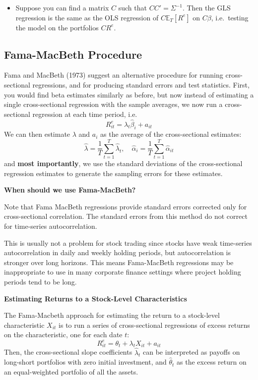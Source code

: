 \documentclass[
]{book}
\providecommand{\tightlist}{%
  \setlength{\itemsep}{0pt}\setlength{\parskip}{0pt}}
\begin{document}
\begin{itemize}
\tightlist
\item
  Suppose you can find a matrix \(C\) such that \(CC'=\Sigma^{-1}\). Then the GLS regression is the same as the OLS regression of \(C\mathbb{E}_T[R^e]\) on \(C\beta\), i.e.~testing the model on the portfolios \(CR^e\).
\end{itemize}

\hypertarget{fama-macbeth-procedure}{%
\subsection{Fama-MacBeth Procedure}\label{fama-macbeth-procedure}}

Fama and MacBeth (1973) suggest an alternative procedure for running cross-sectional regressions, and for producing standard errors and test statistics. First, you would find beta estimates similarly as before, but now instead of estimating a single cross-sectional regression with the sample averages, we now run a cross-sectional regression at each time period, i.e.
\[
R_{it}^{e}=\lambda_{t}\hat{\beta}_{i}+a_{it}
\]
We can then estimate \(\lambda\) and \(a_i\) as the average of the cross-sectional estimates:
\[
\hat{\lambda}=\frac{1}{T}\sum_{t=1}^{T}\hat{\lambda}_{t},\quad\hat{\alpha}_{i}=\frac{1}{T}\sum_{t=1}^{T}\hat{\alpha}_{it}
\]
and \textbf{most importantly}, we use the standard deviations of the cross-sectional regression estimates to generate the sampling errors for these estimates.

\textbf{When should we use Fama-MacBeth?}

Note that Fama MacBeth regressions provide standard errors corrected only for cross-sectional correlation. The standard errors from this method do not correct for time-series autocorrelation.

This is usually not a problem for stock trading since stocks have weak time-series autocorrelation in daily and weekly holding periods, but autocorrelation is stronger over long horizons. This means Fama-MacBeth regressions may be inappropriate to use in many corporate finance settings where project holding periods tend to be long.

\textbf{Estimating Returns to a Stock-Level Characteristics}

The Fama-Macbeth approach for estimating the return to a stock-level characteristic \(X_{it}\) is to run a series of cross-sectional regressions of excess returns on the characteristic, one for each date \(t\):
\[
R_{it}^{e}=\theta_{t}+\lambda_{t}X_{it}+a_{it}
\]
Then, the cross-sectional slope coefficients \(\hat{\lambda}_{t}\) can be interpreted as payoffs on long-short portfolios with zero initial investment, and \(\hat{\theta}_{t}\) as the excess return on an equal-weighted portfolio of all the assets.
\end{document}

